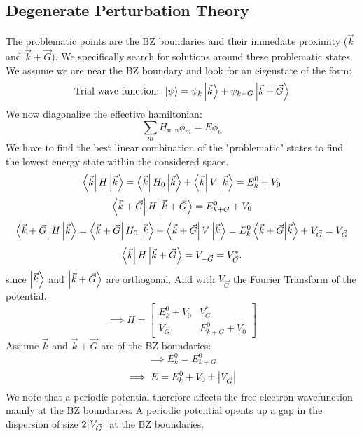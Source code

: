 \documentclass{report}
\begin{document}
\subsection{Degenerate Perturbation Theory}
The problematic points are the BZ boundaries and their immediate proximity ($\vec{k}$ and $\vec{k} + \vec{G}$). We specifically search for solutions around these problematic states.\\
We assume we are near the BZ boundary and look for an eigenstate of the form: \[
	\text{Trial wave function:  }\ket{\psi} = \psi_k \ket{\vec{k}} + \psi_{k+G} \ket{\vec{k} + \vec{G}}  
\] We now diagonalize the effective hamiltonian: \[
\sum_{m} H_\text{m,n} \phi_m = E \phi_n
\] We have to find the best linear combination of the "problematic" states to find the lowest energy state within the considered space. \[
\bra{\vec{k}} H \ket{\vec{k}} = \bra{\vec{k}} H_0\ket{\vec{k}} + \bra{\vec{k}} V \ket{\vec{k}} = E_k^0 + V_0
\]\[
\bra{\vec{k} + \vec{G}} H \ket{\vec{k} + \vec{G}} = E_{k+G}^0 + V_0
\]\[
\bra{\vec{k} + \vec{G}} H \ket{\vec{k}} = \bra{\vec{k} + \vec{G}} H_0 \ket{\vec{k}} + \bra{\vec{k} + \vec{G}} V \ket{\vec{k}} = E_k^0 \bra{\vec{k} + \vec{G}}\ket{\vec{k}} + V_{\vec{G}} = V_{\vec{G}} 
\]\[
\bra{\vec{k}} H \ket{\vec{k} + \vec{G}} = V_{-\vec{G}} = V_{\vec{G}}^*
.\] since $\ket{\vec{k}} $ and $\ket{\vec{k} + \vec{G}} $ are orthogonal. And with $V_{\vec{G}}$ the Fourier Transform of the potential. \[
\implies H = \begin{bmatrix} E_k^0 + V_0 & V_G^* \\ V_G & E_{k+G}^0 + V_0 \end{bmatrix} 
\] Assume $\vec{k}$ and $\vec{k} + \vec{G}$ are of the BZ boundaries: \[
\implies E_k^0 = E_{k+G}^0
\]\[
\implies E = E_k^0 + V_0 \pm \abs{V_{\vec{G}}}
\] We note that a periodic potential therefore affects the free electron wavefunction mainly at the BZ boundaries. A periodic potential opents up a gap in the dispersion of size $2 \abs{V_{\vec{G}}}$ at the BZ boundaries.\\
\end{document}

